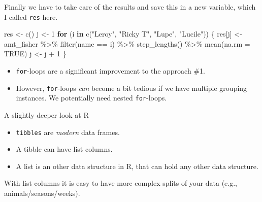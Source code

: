 \documentclass[ignorenonframetext,,t]{beamer}
\let\oldtextbf\textbf
\renewcommand{\textbf}[1]{\textcolor{spamwell}{\oldtextbf{#1}}}
\providecommand{\tightlist}{%
\setlength{\itemsep}{0pt}\setlength{\parskip}{0pt}}
\newenvironment{Shaded}{\begin{snugshade}}{\end{snugshade}}
\newcommand{\AttributeTok}[1]{\textcolor[rgb]{0.77,0.63,0.00}{#1}}
\newcommand{\ConstantTok}[1]{\textcolor[rgb]{0.00,0.00,0.00}{#1}}
\newcommand{\ControlFlowTok}[1]{\textcolor[rgb]{0.13,0.29,0.53}{\textbf{#1}}}
\newcommand{\DecValTok}[1]{\textcolor[rgb]{0.00,0.00,0.81}{#1}}
\newcommand{\FunctionTok}[1]{\textcolor[rgb]{0.00,0.00,0.00}{#1}}
\newcommand{\NormalTok}[1]{#1}
\newcommand{\OtherTok}[1]{\textcolor[rgb]{0.56,0.35,0.01}{#1}}
\newcommand{\SpecialCharTok}[1]{\textcolor[rgb]{0.00,0.00,0.00}{#1}}
\newcommand{\StringTok}[1]{\textcolor[rgb]{0.31,0.60,0.02}{#1}}
\providecommand{\tightlist}{%
\setlength{\itemsep}{0pt}\setlength{\parskip}{0pt}}
\renewcommand{\tightlist}{\setlength{\itemsep}{1.4ex}\setlength{\parskip}{0pt}}
\begin{document}
\begin{frame}[fragile]
Finally we have to take care of the results and save this in a new
variable, which I called \texttt{res} here.

\begin{Shaded}
\begin{Highlighting}[]
\NormalTok{res }\OtherTok{\textless{}{-}} \FunctionTok{c}\NormalTok{()}
\NormalTok{j }\OtherTok{\textless{}{-}} \DecValTok{1}
\ControlFlowTok{for}\NormalTok{ (i }\ControlFlowTok{in} \FunctionTok{c}\NormalTok{(}\StringTok{"Leroy"}\NormalTok{, }\StringTok{"Ricky T"}\NormalTok{, }\StringTok{"Lupe"}\NormalTok{, }\StringTok{"Lucile"}\NormalTok{)) \{}
\NormalTok{  res[j] }\OtherTok{\textless{}{-}}\NormalTok{ amt\_fisher }\SpecialCharTok{\%\textgreater{}\%} \FunctionTok{filter}\NormalTok{(name }\SpecialCharTok{==}\NormalTok{ i) }\SpecialCharTok{\%\textgreater{}\%} 
    \FunctionTok{step\_lengths}\NormalTok{() }\SpecialCharTok{\%\textgreater{}\%} \FunctionTok{mean}\NormalTok{(}\AttributeTok{na.rm =} \ConstantTok{TRUE}\NormalTok{)}
\NormalTok{  j }\OtherTok{\textless{}{-}}\NormalTok{ j }\SpecialCharTok{+} \DecValTok{1}
\NormalTok{\}}
\end{Highlighting}
\end{Shaded}
\end{frame}

\begin{frame}[fragile]
\begin{itemize}
\tightlist
\item
  \texttt{for}-loops are a significant improvement to the approach \#1.
\item
  However, \texttt{for}-loops \emph{can} become a bit tedious if we have
  multiple grouping instances. We potentially need nested
  \texttt{for}-loops.
\end{itemize}
\end{frame}

\begin{frame}[fragile]{A slightly deeper look at R}
\protect\hypertarget{a-slightly-deeper-look-at-r}{}
\begin{itemize}
\tightlist
\item
  \texttt{tibbles} are \emph{modern} data frames.
\item
  A tibble can have list columns.
\item
  A list is an other data structure in R, that can hold any other data
  structure.
\end{itemize}

With list columns it is easy to have more complex splits of your data
(e.g., animals/seasons/weeks).
\end{frame}
\end{document}
